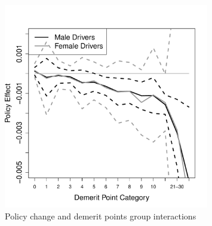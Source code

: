 \documentclass[12pt]{paper}
\begin{document}
\begin{figure}
\centering
\includegraphics[width=0.8\textwidth]{../Figures/FFX_reg_policy_points_grp_high_pts.pdf}
\caption{Policy change and demerit points group interactions}
% 
\label{fig:FE-regs}
\end{figure}
\end{document}
